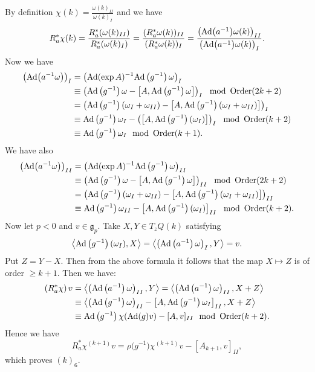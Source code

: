 \documentclass[pdftex]{sigma}%
\newcommand{\g}{\mathfrak g}
\newcommand{\Ad}{\operatorname{Ad}}
\newcommand{\Order}{\operatorname{Order}}
\numberwithin{equation}{section}
\begin{document}
By definition
$\chi(k) = \frac {\omega(k)_{II}} { \omega(k)_I}$
and we have
\[
R_a^*\chi(k)
= \frac {R_a^* (\omega(k)_{II})}{R_a^*( \omega(k)_I) }
=\frac { (R_a^*\omega(k))_{II}} { (R_a^*\omega(k))_I}
=\frac { \big({\rm Ad}\big(a^{-1}\big)\omega(k)\big)_{II}} { \big({\rm Ad}\big(a^{-1}\big)\omega(k)\big)_I}.
\]
Now we have
\begin{align*}
\left({\rm Ad}\big(a^{-1}\omega\big)\right)_I
	&=\left(\Ad (\exp A)^{-1} {\rm Ad}\left(g^{-1}\right)\omega\right)_I \\
	&\equiv \left( {\rm Ad}\left(g^{-1}\right)\omega - \left[ A, {\rm Ad}\left(g^{-1}\right)\omega \right] \right)_I \mod \Order(2k+2)
\\
	&= \left( {\rm Ad}\left(g^{-1}\right) (\omega_I + \omega_{II} ) - \left[ A, {\rm Ad}\left(g^{-1}\right) (\omega_I + \omega_{II}) \right] \right)_I \\
	&\equiv {\rm Ad}\left(g^{-1}\right) \omega_I - \left( \left[ A, {\rm Ad}\left(g^{-1}\right) (\omega_I ) \right] \right)_I \mod \Order(k+2)
\\
	&\equiv {\rm Ad}\left(g^{-1}\right) \omega_I \mod \Order(k+1).
\end{align*}
We have also
\begin{align*}
	\left({\rm Ad}\big(a^{-1}\omega\big)\right)_{II}
	&=\left(\Ad (\exp A)^{-1} {\rm Ad}\left(g^{-1}\right)\omega\right)_{II} \\
	&\equiv \left( {\rm Ad}\left(g^{-1}\right)\omega - \left[ A, {\rm Ad}\left(g^{-1}\right)\omega \right] \right)_{II}
	\mod \Order(2k+2) \\
	&= \left( {\rm Ad}\left(g^{-1}\right) (\omega_I + \omega_{II} ) - \left[ A, {\rm Ad}\left(g^{-1}\right) (\omega_I + \omega_{II} ) \right] \right)_{I I} \\
	&\equiv {\rm Ad}\left(g^{-1}\right) \omega_{II} - \left[ A, {\rm Ad}\left(g^{-1}\right) (\omega_I ) \right]_{II} \mod \Order(k+2).
\end{align*}
Now let $ p < 0$ and $ v \in \g_p $. Take $ X, Y \in T_zQ(k)$ satisfying
\[
\left\langle {\rm Ad}\left(g^{-1}\right) (\omega_I) , X \right\rangle
= \left\langle \left({\rm Ad}\left(a^{-1}\right)\omega\right)_I , Y \right\rangle = v.
\]
Put $Z = Y-X$. Then from the above formula it follows that
the map $ X \mapsto Z$ is of order $\ge k+1$.
Then we have:
\begin{align*}
	\left(R_a^*\chi \right)v &= \left\langle \left({\rm Ad}\left(a^{-1}\right)\omega\right)_{II} , Y \right\rangle
= \left\langle \left({\rm Ad}\left(a^{-1}\right)\omega\right)_{II} , X+Z \right\rangle \\
	&\equiv \left\langle\left( {\rm Ad}\left(g^{-1}\right)\omega\right)_{II} - \left[ A, {\rm Ad}\left(g^{-1}\right) \omega_I \right]_{II} , X+ Z \right\rangle
\\
	&\equiv {\rm Ad}\left(g^{-1}\right) \chi ({\rm Ad}(g)v) - [ A, v] _{II} \mod \Order (k+2).
\end{align*}
Hence we have
\[
R_a^* \chi ^{(k+1)} v = \rho \big(g^{-1} \big) \chi ^{(k+1)}v - [A_{k+1} , v ] _{II},
\]
which proves $(k)_6$.
\end{document}
